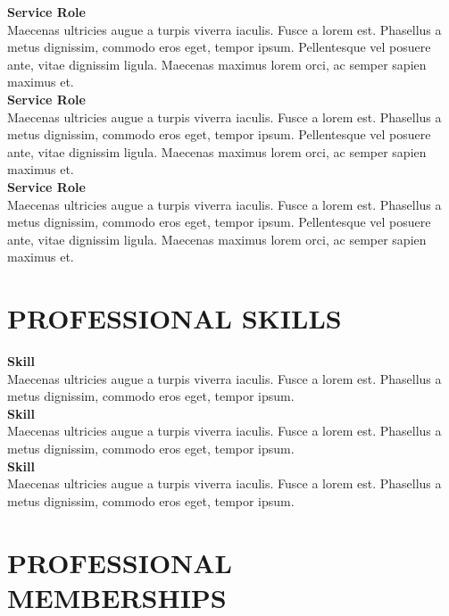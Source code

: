 \documentclass[a4paper,9pt]{extarticle}
\begin{document}
\noindent
\newline
\textbf{Service Role} \\
Maecenas ultricies augue a turpis viverra iaculis. Fusce a lorem est. Phasellus a metus dignissim, commodo eros eget, tempor ipsum. Pellentesque vel posuere ante, vitae dignissim ligula. Maecenas maximus lorem orci, ac semper sapien maximus et. \\

\noindent
\textbf{Service Role} \\
Maecenas ultricies augue a turpis viverra iaculis. Fusce a lorem est. Phasellus a metus dignissim, commodo eros eget, tempor ipsum. Pellentesque vel posuere ante, vitae dignissim ligula. Maecenas maximus lorem orci, ac semper sapien maximus et. \\

\noindent
\textbf{Service Role} \\
Maecenas ultricies augue a turpis viverra iaculis. Fusce a lorem est. Phasellus a metus dignissim, commodo eros eget, tempor ipsum. Pellentesque vel posuere ante, vitae dignissim ligula. Maecenas maximus lorem orci, ac semper sapien maximus et. 


\section*{PROFESSIONAL SKILLS}

\noindent
\newline
\textbf{Skill} \\
Maecenas ultricies augue a turpis viverra iaculis. Fusce a lorem est. Phasellus a metus dignissim, commodo eros eget, tempor ipsum.  \\

\noindent
\textbf{Skill} \\
Maecenas ultricies augue a turpis viverra iaculis. Fusce a lorem est. Phasellus a metus dignissim, commodo eros eget, tempor ipsum.  \\

\noindent
\textbf{Skill} \\
Maecenas ultricies augue a turpis viverra iaculis. Fusce a lorem est. Phasellus a metus dignissim, commodo eros eget, tempor ipsum.  


\section*{PROFESSIONAL MEMBERSHIPS}
\end{document}
